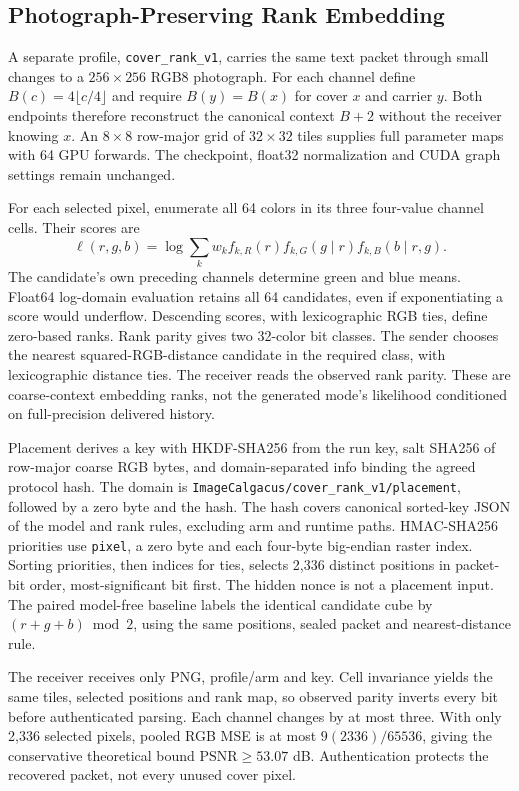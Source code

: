 \subsection{Photograph-Preserving Rank Embedding}
\label{sec:cover-method}
A separate profile, \texttt{cover\_rank\_v1}, carries the same text packet through small changes to a $256\times256$ RGB8 photograph. For each channel define $B(c)=4\lfloor c/4\rfloor$ and require $B(y)=B(x)$ for cover $x$ and carrier $y$. Both endpoints therefore reconstruct the canonical context $B+2$ without the receiver knowing $x$. An $8\times8$ row-major grid of $32\times32$ tiles supplies full parameter maps with 64 GPU forwards. The checkpoint, float32 normalization and CUDA graph settings remain unchanged.

For each selected pixel, enumerate all 64 colors in its three four-value channel cells. Their scores are
\begin{equation}
\ell(r,g,b)=\log\sum_k w_k f_{k,R}(r)f_{k,G}(g\mid r)f_{k,B}(b\mid r,g).
\end{equation}
The candidate's own preceding channels determine green and blue means. Float64 log-domain evaluation retains all 64 candidates, even if exponentiating a score would underflow. Descending scores, with lexicographic RGB ties, define zero-based ranks. Rank parity gives two 32-color bit classes. The sender chooses the nearest squared-RGB-distance candidate in the required class, with lexicographic distance ties. The receiver reads the observed rank parity. These are coarse-context embedding ranks, not the generated mode's likelihood conditioned on full-precision delivered history.

Placement derives a key with HKDF-SHA256 from the run key, salt SHA256 of row-major coarse RGB bytes, and domain-separated info binding the agreed protocol hash. The domain is \texttt{ImageCalgacus/cover\_rank\_v1/placement}, followed by a zero byte and the hash. The hash covers canonical sorted-key JSON of the model and rank rules, excluding arm and runtime paths. HMAC-SHA256 priorities use \texttt{pixel}, a zero byte and each four-byte big-endian raster index. Sorting priorities, then indices for ties, selects 2,336 distinct positions in packet-bit order, most-significant bit first. The hidden nonce is not a placement input. The paired model-free baseline labels the identical candidate cube by $(r+g+b)\bmod2$, using the same positions, sealed packet and nearest-distance rule.

The receiver receives only PNG, profile/arm and key. Cell invariance yields the same tiles, selected positions and rank map, so observed parity inverts every bit before authenticated parsing. Each channel changes by at most three. With only 2,336 selected pixels, pooled RGB MSE is at most $9(2336)/65536$, giving the conservative theoretical bound $\mathrm{PSNR}\geq53.07$ dB. Authentication protects the recovered packet, not every unused cover pixel.

